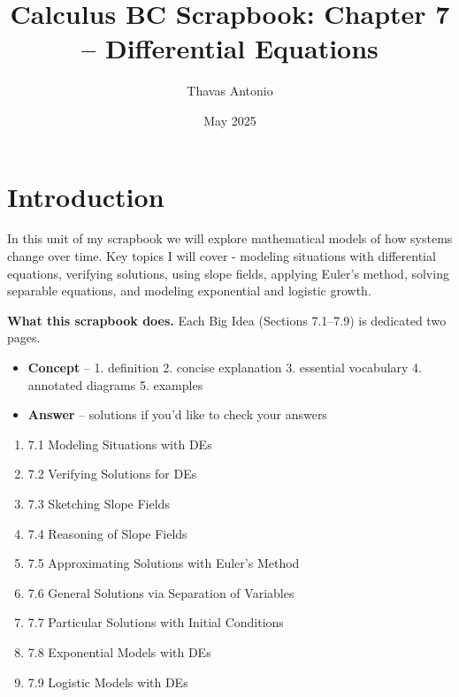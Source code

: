 \documentclass{article}
\title{\textbf{Calculus BC Scrapbook: Chapter 7 – Differential Equations}}
\author{Thavas Antonio}
\date{May 2025}
\begin{document}
\maketitle     
\tableofcontents
\newpage

\section{Introduction}

In this unit of my scrapbook we will explore mathematical models of how systems change over time. Key topics I will cover -
modeling situations with differential equations, verifying solutions, using slope fields, applying Euler's method, solving separable equations, and modeling exponential and logistic growth. 

\medskip
\noindent
\textbf{What this scrapbook does.}  Each Big Idea (Sections 7.1–7.9) is dedicated two pages.

\begin{itemize}
  \item \textbf{Concept} – 1. definition 2. concise explanation 3. essential vocabulary 4. annotated diagrams 5. examples
  \item \textbf{Answer} – solutions if you'd like to check your answers
\end{itemize}

\vspace{10pt}

\begin{tcolorbox}[title=Chapter 7 Roadmap,colback=gray!8,colframe=cyan]
\begin{enumerate}
  \item 7.1 Modeling Situations with DEs  
  \item 7.2 Verifying Solutions for DEs  
  \item 7.3 Sketching Slope Fields  
  \item 7.4 Reasoning of Slope Fields  
  \item 7.5 Approximating Solutions with Euler’s Method 
  \item 7.6 General Solutions via Separation of Variables  
  \item 7.7 Particular Solutions with Initial Conditions  
  \item 7.8 Exponential Models with DEs  
  \item 7.9 Logistic Models with DEs
\end{enumerate}
\end{tcolorbox}
\newpage
\end{document}
